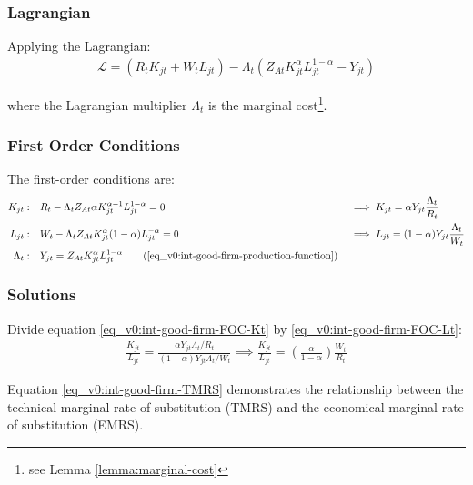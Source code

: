 \documentclass[../thesis.tex]{subfiles}
\begin{document}
	
	\subsubsection*{Lagrangian}
	
	Applying the Lagrangian:
	\begin{align}
		\label{eq_v0:int-good-firm-lagrangian}
		\mathcal{L} = (R_t K_{jt} + W_t L_{jt}) - \Lambda_t (Z_{At} K_{jt}^\alpha L_{jt}^{1-\alpha} - Y_{jt})
	\end{align}
	
	where the Lagrangian multiplier $\Lambda_t$ is the marginal cost\footnote{see Lemma \ref{lemma:marginal-cost}}.
	
	\subsubsection*{First Order Conditions}
	
	The first-order conditions are:
	\begin{alignat}{2}
		K_{jt}: \quad & R_t - \Lambda_t Z_{At} \alpha K_{jt}^{\alpha-1} L_{jt}^{1-\alpha} = 0 &&\implies K_{jt} = \alpha Y_{jt} \frac{\Lambda_t}{R_t} \label{eq_v0:int-good-firm-FOC-Kt} \\
		L_{jt}: \quad & W_t - \Lambda_t Z_{At} K_{jt}^\alpha (1-\alpha) L_{jt}^{-\alpha} = 0 \quad &&\implies L_{jt} = (1-\alpha) Y_{jt} \frac{\Lambda_t}{W_t} \label{eq_v0:int-good-firm-FOC-Lt} \\
		\Lambda_t: \quad & Y_{jt} = Z_{At} K_{jt}^\alpha L_{jt}^{1-\alpha} \tag{\ref{eq_v0:int-good-firm-production-function}}
	\end{alignat}
	
	\subsubsection*{Solutions}
	
	Divide equation \ref{eq_v0:int-good-firm-FOC-Kt} by \ref{eq_v0:int-good-firm-FOC-Lt}:
	\begin{align}
		\frac{K_{jt}}{L_{jt}} = \frac{\alpha Y_{jt} \Lambda_t /R_t}{(1-\alpha) Y_{jt} \Lambda_t /W_t} \implies
		\frac{K_{jt}}{L_{jt}} = \left( \frac{\alpha}{1-\alpha} \right) \frac{W_t}{R_t} \label{eq_v0:int-good-firm-TMRS}
	\end{align}
	
	Equation \ref{eq_v0:int-good-firm-TMRS} demonstrates the relationship between the technical marginal rate of substitution (TMRS) and the economical marginal rate of substitution (EMRS). 
	
\end{document}
